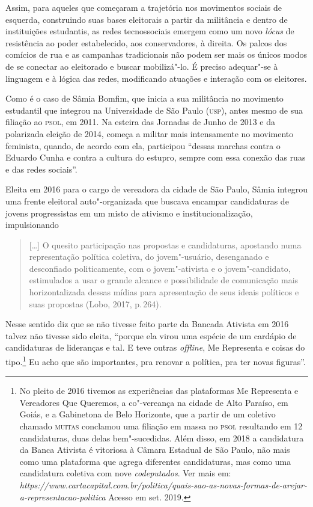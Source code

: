 Assim, para aqueles que começaram a trajetória nos movimentos sociais de
esquerda, construindo suas bases eleitorais a partir da militância e
dentro de instituições estudantis, as redes tecnossociais emergem como
um novo \emph{lócus} de resistência ao poder estabelecido, aos
conservadores, à direita. Os palcos dos comícios de rua e as campanhas
tradicionais não podem ser mais os únicos modos de se conectar ao
eleitorado e buscar mobilizá"-lo. É preciso adequar"-se à linguagem e à
lógica das redes, modificando atuações e interação com os eleitores.

Como é o caso de Sâmia Bomfim, que inicia a sua militância no movimento
estudantil que integrou na Universidade de São Paulo (\textsc{usp}), antes mesmo
de sua filiação ao \textsc{psol}, em 2011. Na esteira das Jornadas de Junho de
2013 e da polarizada eleição de 2014, começa a militar mais intensamente
no movimento feminista, quando, de acordo com ela, participou ``dessas
marchas contra o Eduardo Cunha e contra a cultura do estupro, sempre com
essa conexão das ruas e das redes sociais''.

Eleita em 2016 para o cargo de vereadora da cidade de São Paulo, Sâmia
integrou uma frente eleitoral auto"-organizada que buscava encampar
candidaturas de jovens progressistas em um misto de ativismo e
institucionalização, impulsionando

\begin{quote}
{[}\ldots{}{]} O quesito participação nas propostas e candidaturas, apostando
numa representação política coletiva, do jovem"-usuário, desenganado e
desconfiado politicamente, com o jovem"-ativista e o jovem"-candidato,
estimulados a usar o grande alcance e possibilidade de comunicação mais
horizontalizada dessas mídias para apresentação de seus ideais políticos
e suas propostas (Lobo, 2017, p.\,264).
\end{quote}

Nesse sentido diz que se não tivesse feito parte da Bancada Ativista em
2016 talvez não tivesse sido eleita, ``porque ela virou uma espécie de
um cardápio de candidaturas de lideranças e tal. E teve outras \emph{offline},
Me Representa e coisas do tipo.\footnote{No pleito de 2016 tivemos as
  experiências das plataformas Me Representa e Vereadores Que Queremos,
  a co"-vereança na cidade de Alto Paraíso, em Goiás, e a Gabinetona de
  Belo Horizonte, que a partir de um coletivo chamado \textsc{muitas} conclamou
  uma filiação em massa no \textsc{psol} resultando em 12 candidaturas, duas
  delas bem"-sucedidas. Além disso, em 2018 a candidatura da Banca
  Ativista é vitoriosa à Câmara Estadual de São Paulo, não mais como uma
  plataforma que agrega diferentes candidaturas, mas como uma
  candidatura coletiva com nove \emph{codeputados}. Ver mais em:
  \emph{https://www.cartacapital.com.br/politica/quais-sao-as-novas-formas-de-arejar-a-representacao-politica}
  Acesso em set. 2019.} Eu acho que são importantes, pra renovar a
política, pra ter novas figuras''.

